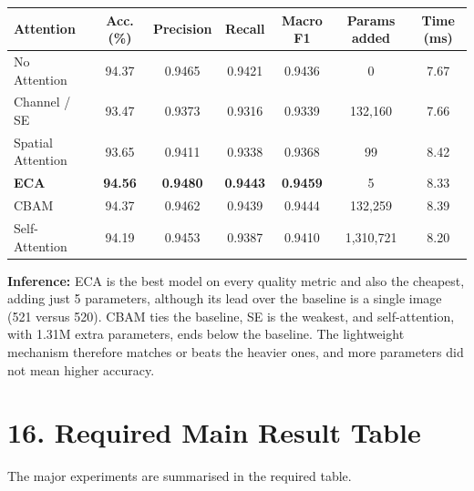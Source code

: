 \documentclass[11pt]{article}
\begin{document}
\begin{center}
\small
\begin{tabular}{|l|c|c|c|c|c|c|}
\hline
Attention & Acc. (\%) & Precision & Recall & Macro F1 & Params added & Time (ms)\\
\hline
No Attention & 94.37 & 0.9465 & 0.9421 & 0.9436 & 0 & 7.67\\
Channel / SE & 93.47 & 0.9373 & 0.9316 & 0.9339 & 132{,}160 & 7.66\\
Spatial Attention & 93.65 & 0.9411 & 0.9338 & 0.9368 & 99 & 8.42\\
\textbf{ECA} & \textbf{94.56} & \textbf{0.9480} & \textbf{0.9443} & \textbf{0.9459} & 5 & 8.33\\
CBAM & 94.37 & 0.9462 & 0.9439 & 0.9444 & 132{,}259 & 8.39\\
Self-Attention & 94.19 & 0.9453 & 0.9387 & 0.9410 & 1{,}310{,}721 & 8.20\\
\hline
\end{tabular}
\end{center}

\textbf{Inference:} ECA is the best model on every quality metric and also
the cheapest, adding just 5 parameters, although its lead over the
baseline is a single image (521 versus 520). CBAM ties the baseline,
SE is the weakest, and self-attention, with 1.31M extra parameters, ends
below the baseline. The lightweight mechanism therefore matches or beats
the heavier ones, and more parameters did not mean higher accuracy.

\section*{16. Required Main Result Table}

The major experiments are summarised in the required table.
\end{document}
